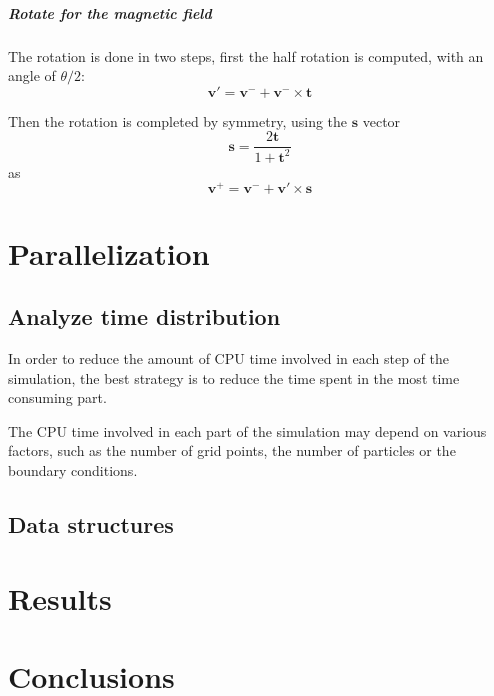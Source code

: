 \documentclass[a5paper,12pt,landscape]{report}
\newcommand*\V[1]{\bm{#1}}
\renewcommand*{\v}{\V{v}}
\begin{document}
\paragraph{Rotate for the magnetic field} The rotation is done in two steps, 
first the half rotation is computed, with an angle of $\theta/2$:
$$\v' = \v^- + \v^- \times \V t $$

Then the rotation is completed by symmetry, using the $\V s$ vector
$$ \V s = \frac{2 \V t}{1 + \V t^2} $$
as
$$ \V{v^+} = \V{v^-} + \V{v}' \times \V{s} $$

\chapter{Parallelization}

\section{Analyze time distribution}

In order to reduce the amount of CPU time involved in each step of the 
simulation, the best strategy is to reduce the time spent in the most time 
consuming part.

The CPU time involved in each part of the simulation may depend on various 
factors, such as the number of grid points, the number of particles or the 
boundary conditions.



\section{Data structures}

\chapter{Results}

\chapter{Conclusions}

%
%
\end{document}
